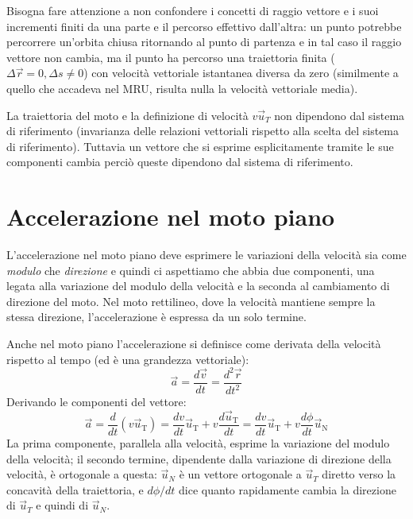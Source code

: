 \documentclass[class=book, crop=false, oneside, 12pt]{standalone}
\begin{document}
Bisogna fare attenzione a non confondere i concetti di raggio vettore e i suoi incrementi finiti da una parte e il percorso effettivo dall'altra:
un punto potrebbe percorrere un'orbita chiusa ritornando al punto di partenza e in tal caso il raggio vettore non cambia, ma il punto ha percorso una traiettoria finita (\(\Delta \overrightarrow{r} = 0, \Delta s \neq 0\)) con velocità vettoriale istantanea diversa da zero (similmente a quello che accadeva nel MRU, risulta nulla la velocità vettoriale media).

La traiettoria del moto e la definizione di velocità \(v \overrightarrow{u}_T\) non dipendono dal sistema di riferimento (invarianza delle relazioni vettoriali rispetto alla scelta del sistema di riferimento).
Tuttavia un vettore che si esprime esplicitamente tramite le sue componenti cambia perciò queste dipendono dal sistema di riferimento.

\section{Accelerazione nel moto piano}

L'accelerazione nel moto piano deve esprimere le variazioni della velocità sia come \emph{modulo} che \emph{direzione} e quindi ci aspettiamo che abbia due componenti,
una legata alla variazione del modulo della velocità e la seconda al cambiamento di direzione del moto.
Nel moto rettilineo, dove la velocità mantiene sempre la stessa direzione, l'accelerazione è espressa da un solo termine.

Anche nel moto piano l'accelerazione si definisce come derivata della velocità rispetto al tempo (ed è una grandezza vettoriale):
\begin{equation}
  \overrightarrow{a} = \frac{d \overrightarrow{v}}{dt} = \frac{d^2 \overrightarrow{r}}{dt^2}
\end{equation}
Derivando le componenti del vettore:
\begin{equation}
  \overrightarrow{a}=\frac{d}{d t}\left(v \overrightarrow{u}_{\mathrm{T}}\right)=\frac{d v}{d t} \overrightarrow{u}_{\mathrm{T}}+v \frac{d \overrightarrow{u}_{\mathrm{T}}}{d t}=\frac{d v}{d t} \overrightarrow{u}_{\mathrm{T}}+v \frac{d \phi}{d t} \overrightarrow{u}_{\mathrm{N}}
\end{equation}
La prima componente, parallela alla velocità, esprime la variazione del modulo della velocità; il secondo termine, dipendente dalla variazione di direzione della velocità, è ortogonale a questa:
\(\overrightarrow{u}_N\) è un vettore ortogonale a \(\overrightarrow{u}_T\) diretto verso la concavità della traiettoria, e \(d \phi/dt \) dice quanto rapidamente cambia la direzione di \(\overrightarrow{u}_T\)  e quindi di \(\overrightarrow{u}_N\).
\end{document}

